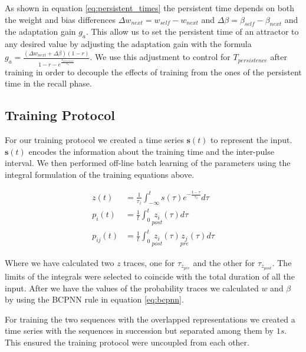 \documentclass[10pt,a4paper]{article}
\begin{document}
As shown in equation \ref{eq:persistent_times} the persistent time depends on both the weight and bias differences $\Delta w_{next} = w_{self} - w_{next}$ and $\Delta \beta = \beta_{self} - \beta_{next}$ and the adaptation gain $g_a$. This allow us to  set the persistent time of an attractor to any desired value by adjusting the adaptation gain with the formula $g_a = \frac{(\Delta w_{next} + \Delta \beta)(1 - r)}{1 - r - e^{\frac{T_{persistence}}{\tau_a}}}$. We use this adjustment to control for $T_{persistence}$ after training in order to decouple the effects of training from the ones of the persistent time in the recall phase. 

\subsection{Training Protocol}
For our training protocol we created a time series  $\mathbf{s}(t)$ to represent the input. $\mathbf{s}(t)$  encodes the information about the training time and the inter-pulse interval. We then performed off-line batch learning of the parameters using the integral formulation of the training equations above.

\begin{align}
z(t) &= \frac{1}{\tau_z } \int_{-\infty}^{t} s(\tau) e^{-\frac{t - \tau}{\tau_z}} d\tau \label{eq:flitering}  \\
p_i(t) &= \frac{1}{t}\int_0^{t} \underset{post}{z_i}(\tau) d\tau  \label{eq:bcpnn_off_line_prob} \\
p_{ij}(t) &= \frac{1}{t}\int_0^{t} \underset{post}{z_i}(\tau) 
\underset{pre}{z_j}(\tau) d\tau \label{eq:bcpnn_off_line_joint} 
\end{align}

Where we have calculated two $z$ traces, one for $\tau_{z_{pre}}$ and the other for $\tau_{z_{post}}$. The limits of the integrals were selected to coincide with the total duration of all the input. After we have the values of the probability traces we calculated $w$ and $\beta$ by using the BCPNN rule in equation \ref{eq:bcpnn}.

For training the two sequences with the overlapped representations we created a time series with the sequences in succession but separated among them by $1s$. This ensured the training protocol were uncoupled from each other.
\end{document}
